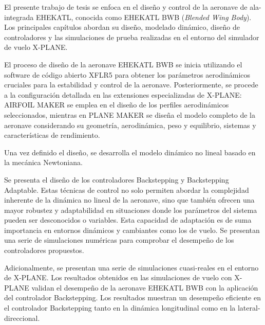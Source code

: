 


\begin{abstracts}        %

El presente trabajo de tesis se enfoca en el diseño y control de la aeronave de ala-integrada EHEKATL, conocida como EHEKATL BWB (\textit{Blended Wing Body}). Los principales capítulos abordan su diseño, modelado dinámico, diseño de controladores y las simulaciones de prueba realizadas en el entorno del simulador de vuelo X-PLANE.

El proceso de diseño de la aeronave EHEKATL BWB se inicia utilizando el software de código abierto XFLR5 para obtener los parámetros aerodinámicos cruciales para la estabilidad y control de la aeronave. Posteriormente, se procede a la configuración detallada en las extensiones especializadas de X-PLANE: AIRFOIL MAKER se emplea en el diseño de los perfiles aerodinámicos seleccionados, mientras en PLANE MAKER se diseña el modelo completo de la aeronave considerando su geometría, aerodinámica, peso y equilibrio, sistemas y características de rendimiento.

Una vez definido el diseño, se desarrolla el modelo dinámico no lineal basado en la mecánica Newtoniana.

Se presenta el diseño de los controladores Backstepping y Backstepping Adaptable. Estas técnicas de control no solo permiten abordar la complejidad inherente de la dinámica no lineal de la aeronave, sino que también ofrecen una mayor robustez y adaptabilidad en situaciones donde los parámetros del sistema pueden ser desconocidos o variables. Esta capacidad de adaptación es de suma importancia en entornos dinámicos y cambiantes como los de vuelo. Se presentan una serie de simulaciones numéricas para comprobar el desempeño de los controladores propuestos. 

Adicionalmente, se presentan una serie de simulaciones cuasi-reales en el entorno de X-PLANE. 
Los resultados obtenidos en las simulaciones de vuelo con X-PLANE validan el desempeño de la aeronave EHEKATL BWB con la aplicación del controlador Backstepping. Los resultados muestran un desempeño eficiente en el controlador Backstepping tanto en la dinámica longitudinal como en la lateral-direccional.

\end{abstracts}
